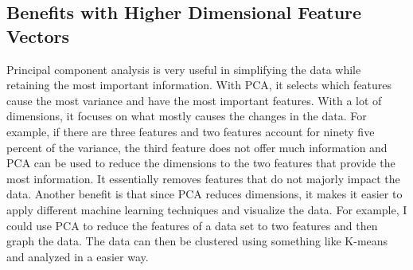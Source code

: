 \documentclass{article}
\begin{document}
\subsection*{Benefits with Higher Dimensional Feature Vectors}
Principal component analysis is very useful in simplifying the data while retaining the most important information. With PCA, it selects which features cause the most variance and have the most important features. With a lot of dimensions, it focuses on what mostly causes the changes in the data. For example, if there are three features and two features account for ninety five percent of the variance, the third feature does not offer much information and PCA can be used to reduce the dimensions to the two features that provide the most information. It essentially removes features that do not majorly impact the data. Another benefit is that since PCA reduces dimensions, it makes it easier to apply different machine learning techniques and visualize the data. For example, I could use PCA to reduce the features of a data set to two features and then graph the data. The data can then be clustered using something like K-means and analyzed in a easier way.
\end{document}
